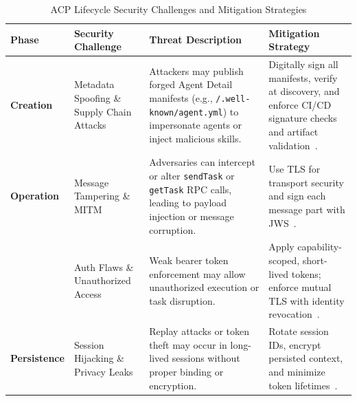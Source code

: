 \documentclass{article}
\begin{document}


\begin{table}[ht]
  \small
  \centering
  \renewcommand{\arraystretch}{1.2}
  \captionsetup{justification=centering}
  \caption{ACP Lifecycle Security Challenges and Mitigation Strategies}
  \label{tab:acp-security-mitigations}
\begin{tabularx}{\textwidth}{|
    >{\centering\arraybackslash}p{2.1cm}|
    >{\raggedright\arraybackslash}X|
    >{\raggedright\arraybackslash}X|
    >{\raggedright\arraybackslash}X
|}
    \hline
    \rowcolor{gray!30}
    \textbf{Phase} & \textbf{Security Challenge} & \textbf{Threat Description} & \textbf{Mitigation Strategy} \\
    \hline

    \textbf{Creation}
    & Metadata Spoofing \& Supply Chain Attacks
    & Attackers may publish forged Agent Detail manifests (e.g., \texttt{/.well-known/agent.yml}) to impersonate agents or inject malicious skills.
    & Digitally sign all manifests, verify at discovery, and enforce CI/CD signature checks and artifact validation~\cite{beeai2024acp}. \\

    \hline

    \textbf{Operation}
    & Message Tampering \& MITM
    & Adversaries can intercept or alter \texttt{sendTask} or \texttt{getTask} RPC calls, leading to payload injection or message corruption.
    & Use TLS for transport security and sign each message part with JWS~\cite{redteaming2025}. \\

    & Auth Flaws \& Unauthorized Access
    & Weak bearer token enforcement may allow unauthorized execution or task disruption.
    & Apply capability-scoped, short-lived tokens; enforce mutual TLS with identity revocation~\cite{mediumA2A2025}. \\

    \hline

    \textbf{Persistence}
    & Session Hijacking \& Privacy Leaks
    & Replay attacks or token theft may occur in long-lived sessions without proper binding or encryption.
    & Rotate session IDs, encrypt persisted context, and minimize token lifetimes~\cite{firewalls2025}. \\


\end{tabularx}
\end{table}
\end{document}
